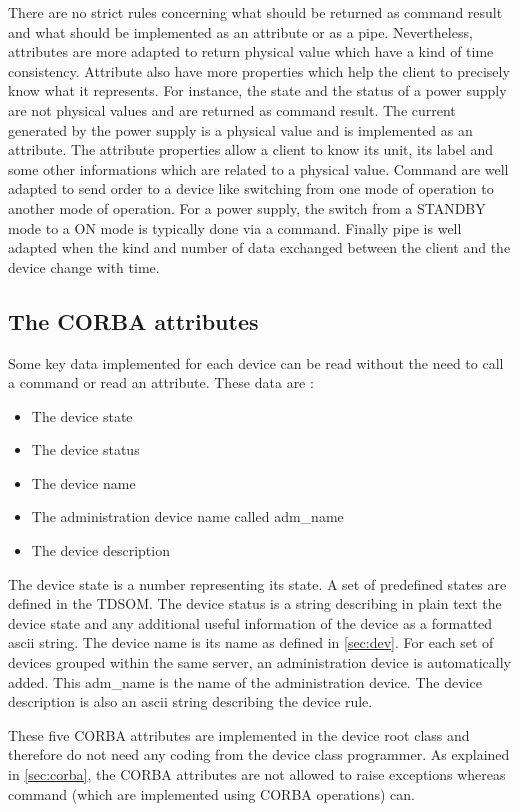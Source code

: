 There are no strict rules concerning what should be returned as command
result and what should be implemented as an attribute or as a pipe.
Nevertheless, attributes are more adapted to return physical value
which have a kind of time consistency. Attribute also have more properties
which help the client to precisely know what it represents. For instance,
the state and the status of a power supply are not physical values
and are returned as command result. The current generated by the power
supply is a physical value and is implemented as an attribute. The
attribute properties allow a client to know its unit, its label and
some other informations which are related to a physical value. Command
are well adapted to send order to a device like switching from one
mode of operation to another mode of operation. For a power supply,
the switch from a STANDBY mode to a ON mode is typically done via
a command. Finally pipe is well adapted when the kind and number of
data exchanged between the client and the device change with time.

\subsection{The CORBA attributes}

Some key data implemented for each device can be read without the
need to call a command or read an attribute. These data are :
\begin{itemize}
\item The device state
\item The device status
\item The device name
\item The administration device name called adm\_name
\item The device description
\end{itemize}
The device state is a number representing its state. A set of predefined
states are defined in the TDSOM. The device status is a string describing
in plain text the device state and any additional useful information
of the device as a formatted ascii string. The device name is its
name as defined in \ref{sec:dev}. For each set of devices grouped
within the same server, an administration device is automatically
added. This adm\_name is the name of the administration device. The
device description is also an ascii string describing the device rule.

These five CORBA attributes are implemented in the device root class
and therefore do not need any coding from the device class programmer.
As explained in \ref{sec:corba}, the CORBA attributes are not allowed
to raise exceptions whereas command (which are implemented using CORBA
operations) can.

